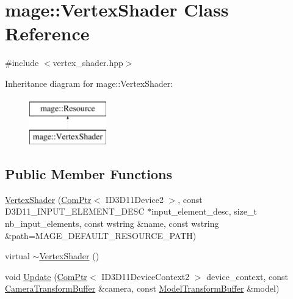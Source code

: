 \hypertarget{classmage_1_1_vertex_shader}{}\section{mage\+:\+:Vertex\+Shader Class Reference}
\label{classmage_1_1_vertex_shader}


{\ttfamily \#include $<$vertex\+\_\+shader.\+hpp$>$}

Inheritance diagram for mage\+:\+:Vertex\+Shader\+:\begin{figure}[H]
\begin{center}
\leavevmode
\includegraphics[height=2.000000cm]{classmage_1_1_vertex_shader}
\end{center}
\end{figure}
\subsection*{Public Member Functions}
\begin{DoxyCompactItemize}
\item 
\hyperlink{classmage_1_1_vertex_shader_a84be7a0ddd761b21284698441b760a81}{Vertex\+Shader} (\hyperlink{namespacemage_ae74f374780900893caa5555d1031fd79}{Com\+Ptr}$<$ I\+D3\+D11\+Device2 $>$, const D3\+D11\+\_\+\+I\+N\+P\+U\+T\+\_\+\+E\+L\+E\+M\+E\+N\+T\+\_\+\+D\+E\+SC $\ast$input\+\_\+element\+\_\+desc, size\+\_\+t nb\+\_\+input\+\_\+elements, const wstring \&name, const wstring \&path=M\+A\+G\+E\+\_\+\+D\+E\+F\+A\+U\+L\+T\+\_\+\+R\+E\+S\+O\+U\+R\+C\+E\+\_\+\+P\+A\+TH)
\item 
virtual \hyperlink{classmage_1_1_vertex_shader_a923dccd98ca878ce91ebb09c7b1cc6cb}{$\sim$\+Vertex\+Shader} ()
\item 
void \hyperlink{classmage_1_1_vertex_shader_a44074d7c56593ebdc2a8a931ecd7b9f6}{Update} (\hyperlink{namespacemage_ae74f374780900893caa5555d1031fd79}{Com\+Ptr}$<$ I\+D3\+D11\+Device\+Context2 $>$ device\+\_\+context, const \hyperlink{structmage_1_1_camera_transform_buffer}{Camera\+Transform\+Buffer} \&camera, const \hyperlink{structmage_1_1_model_transform_buffer}{Model\+Transform\+Buffer} \&model)
\end{DoxyCompactItemize}
